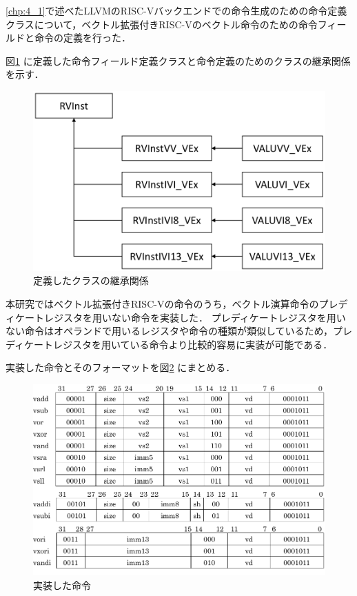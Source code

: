 
\ref{chp:4_1}で述べたLLVMのRISC-Vバックエンドでの命令生成のための命令定義クラスについて，ベクトル拡張付きRISC-Vのベクトル命令のための命令フィールドと命令の定義を行った．

図\ref{fig:MIQSInst_class}
に定義した命令フィールド定義クラスと命令定義のためのクラスの継承関係を示す．

\begin{figure}[tb]
    \centering
    \includegraphics[scale=0.6]{image/MIQSInst_class.pdf}
    \caption{定義したクラスの継承関係}
    \label{fig:MIQSInst_class}
\end{figure}

本研究ではベクトル拡張付きRISC-Vの命令のうち，ベクトル演算命令のプレディケートレジスタを用いない命令を実装した．
プレディケートレジスタを用いない命令はオペランドで用いるレジスタや命令の種類が類似しているため，プレディケートレジスタを用いている命令より比較的容易に実装が可能である．

実装した命令とそのフォーマットを図\ref{fig:jissou_inst_format}
にまとめる．

\begin{figure}[tb]
    \centering
    \includegraphics[scale=0.8]{image/jissou_inst_format.pdf}
    \caption{実装した命令}
    \label{fig:jissou_inst_format}
\end{figure}

